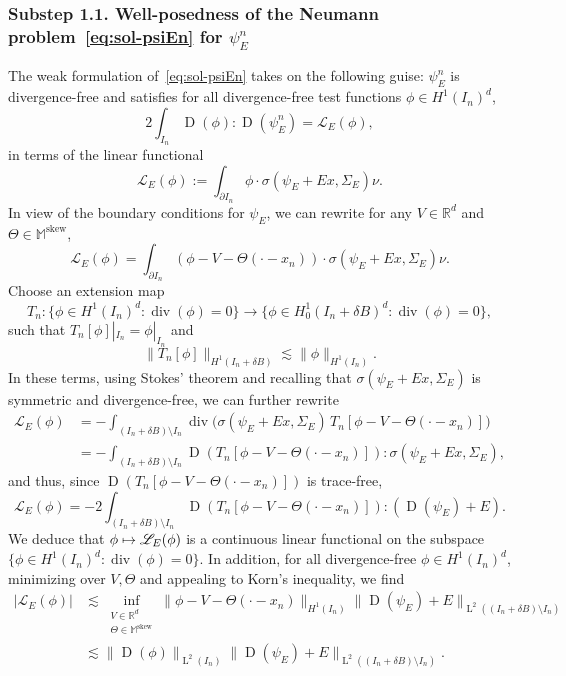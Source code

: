 \documentclass[10pt]{amsart}
\let\mathcal\mathscr
\newcommand\mto{\mathchoice{\longmapsto}{\mapsto}{\mapsto}{\mapsto}}
\theoremstyle{plain}
\theoremstyle{definition}
\newcommand{\Lc}{\mathcal{L}}
\newcommand{\R}{\mathbb R}
\newcommand{\Md}{\mathbb M}
\newcommand{\D}{\operatorname{D}}
\newcommand{\Ld}{\operatorname{L}}
\newcommand{\Div}{{\operatorname{div}}}
\newcommand{\Skew}{{\operatorname{skew}}}
\newcommand{\substep}[1]{\subsubsection*{Substep #1}}
\begin{document}
\substep{1.1. Well-posedness of the Neumann problem~\eqref{eq:sol-psiEn} for $\psi_E^n$}
The weak formulation of~\eqref{eq:sol-psiEn} takes on the following guise: $\psi_E^n$ is divergence-free and satisfies for all divergence-free test functions $\phi\in H^1(I_n)^d$,
\begin{equation}\label{eq:funct-psin}
2\int_{I_n}\D(\phi):\D(\psi_E^{n})=\Lc_E(\phi),
\end{equation}
in terms of the linear functional
\[\Lc_E(\phi):=\int_{\partial I_n}\phi\cdot\sigma(\psi_E+Ex,\Sigma_E)\nu.\]
In view of the boundary conditions for $\psi_E$, we can rewrite for any $V\in\R^d$ and $\Theta\in\Md^\Skew$,
\[\Lc_E(\phi)=\int_{\partial I_n}(\phi-V-\Theta(\cdot-x_n))\cdot\sigma(\psi_E+Ex,\Sigma_E)\nu.\]
Choose an extension map
\[T_n:\big\{\phi\in H^1(I_n)^d:\Div(\phi)=0\big\}\to\big\{\phi\in H^1_0(I_n+\delta B)^d:\Div(\phi)=0\big\},\]
such that $T_n[\phi]|_{I_n}=\phi|_{I_n}$ and
\[\|T_n[\phi]\|_{H^1(I_n+\delta B)}\lesssim \|\phi\|_{H^1(I_n)}.\]
In these terms, using Stokes' theorem and recalling that $\sigma(\psi_E+Ex,\Sigma_E)$ is symmetric and divergence-free, we can further rewrite
\begin{align*}
\Lc_E(\phi)
&=-\int_{(I_n+\delta B)\setminus I_n}\Div\Big(\sigma(\psi_E+Ex,\Sigma_E)\,T_n[\phi-V-\Theta(\cdot-x_n)]\Big)\nonumber\\
&=
-\int_{(I_n+\delta B)\setminus I_n}\D(T_n[\phi-V-\Theta(\cdot-x_n)]):\sigma(\psi_E+Ex,\Sigma_E),
\end{align*}
and thus, since $\D(T_n[\phi-V-\Theta(\cdot-x_n)])$ is trace-free,
\begin{equation}\label{eq:extension-eqn}
\Lc_E(\phi)
=-2\int_{(I_n+\delta B)\setminus I_n}\D(T_n[\phi-V-\Theta(\cdot-x_n)]):(\D(\psi_E)+E).
\end{equation}
We deduce that $\phi\mto\Lc_E(\phi)$ is a continuous linear functional on the subspace \hbox{$\{\phi\in H^1(I_n)^d:\Div(\phi)=0\}$}. In addition, for all divergence-free $\phi\in H^1(I_n)^d$,
minimizing over $V,\Theta$ and appealing to Korn's inequality,
we find
\begin{equation*}\label{eq:bnd-LE}
\begin{aligned}
|\Lc_E(\phi)|
&\lesssim \inf_{\substack{V\in\R^d\\\Theta\in\Md^\Skew}}\|\phi-V-\Theta(\cdot-x_n)\|_{H^1(I_n)}\|\!\D(\psi_E)+E\|_{\Ld^2((I_n+\delta B)\setminus I_n)}\nonumber\\
&\lesssim \|\!\D(\phi)\|_{\Ld^2(I_n)}\|\!\D(\psi_E)+E\|_{\Ld^2((I_n+\delta B)\setminus I_n)}.
\end{aligned}
\end{equation*}
\end{document}
